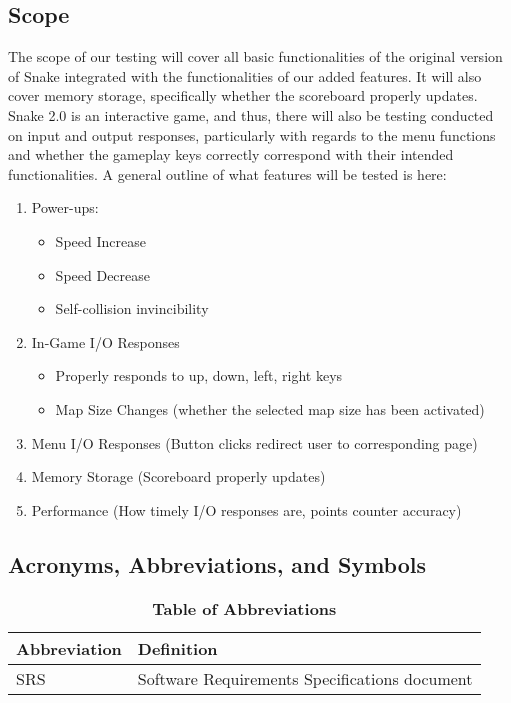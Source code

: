 \documentclass[12pt, titlepage]{article}
\begin{document}
\subsection{Scope}
The scope of our testing will cover all basic functionalities of the original version of Snake integrated with the functionalities of our added features. It will also cover memory storage, specifically whether the scoreboard properly updates. Snake 2.0 is an interactive game, and thus, there will also be testing conducted on input and output responses, particularly with regards to the menu functions and whether the gameplay keys correctly correspond with their intended functionalities. A general outline of what features will be tested is here:
\begin{enumerate}
\item Power-ups:
\begin{itemize}
\item Speed Increase
\item Speed Decrease
\item Self-collision invincibility
\end{itemize}
\item In-Game I/O Responses
\begin{itemize}
\item Properly responds to up, down, left, right keys
\item Map Size Changes (whether the selected map size has been activated)
\end{itemize}
\item Menu I/O Responses (Button clicks redirect user to corresponding page)
\item Memory Storage (Scoreboard properly updates)
\item Performance (How timely I/O responses are, points counter accuracy)
\end{enumerate}

\subsection{Acronyms, Abbreviations, and Symbols}
	
\begin{table}[hbp]
\caption{\textbf{Table of Abbreviations}} \label{Table}

\begin{tabularx}{\textwidth}{p{3cm}X}
\toprule
\textbf{Abbreviation} & \textbf{Definition} \\
\midrule
SRS & Software Requirements Specifications document\\
\bottomrule
\end{tabularx}

\end{table}
\end{document}
